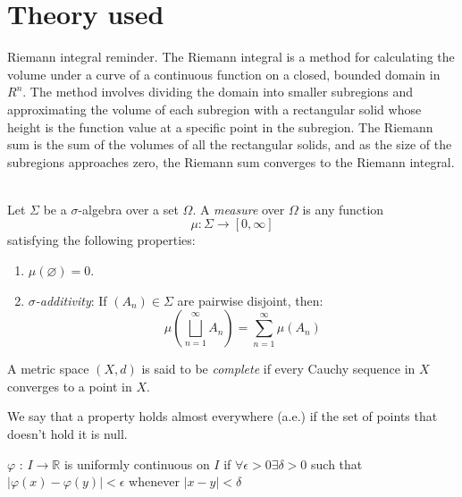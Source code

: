 \documentclass[../main.tex]{subfiles}
\begin{document}
\appendix

\chapter{ Theory used} \label{apx:purification_with_noise}

\begin{definition} Riemann integral reminder. 
The Riemann integral is a method for calculating the volume under a curve of a continuous function on a closed, bounded domain in $R^n$. The method involves dividing the domain into smaller subregions and approximating the volume of each subregion with a rectangular solid whose height is the function value at a specific point in the subregion. The Riemann sum is the sum of the volumes of all the rectangular solids, and as the size of the subregions approaches zero, the Riemann sum converges to the Riemann integral. \\ \\
\end{definition}

\begin{definition}
	Let $\Sigma$ be a $\sigma$-algebra over a set $\Omega$. A \emph{measure} over $\Omega$ is any function $$\mu:\Sigma\longrightarrow[0,\infty]$$ satisfying the following properties:
	\begin{enumerate}
		\item $\mu(\varnothing)=0$.
		\item\label{RFA:sigmaadditivity} \emph{$\sigma$-additivity}: If $(A_n)\in\Sigma$ are pairwise disjoint, then: $$\mu\left(\bigsqcup_{n=1}^\infty A_n\right)=\sum_{n=1}^\infty \mu(A_n)$$
	\end{enumerate}
\end{definition}



\begin{definition} A metric space $(X,d)$ is said to be \emph{complete} if every Cauchy sequence in $X$ converges to a point in $X$. 
\end{definition}

\begin{definition}
We say that a property holds almost everywhere (a.e.) if the set of points that doesn’t hold it is null.
\end{definition}


\begin{definition} 
	$\varphi$ : $I \rightarrow \mathbb{R}$ is uniformly continuous on $I$ if $\forall \epsilon > 0 \exists \delta >0 $ such that $|\varphi(x)- \varphi(y)| < \epsilon$ whenever $|x-y|< \delta$
\end{definition}
\end{document}
